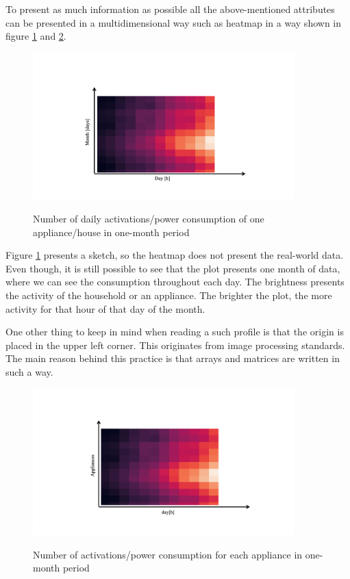 To present as much information as possible all the above-mentioned attributes 
can be presented in a multidimensional way such as heatmap in a way shown in figure \ref{fig:heatmap_2dtime} and \ref{fig:heatmap_all_appl}.

\begin{figure}[H]
	\centering
	\caption{Number of daily activations/power consumption of one appliance/house in one-month period}
	\includegraphics[width=0.9\textwidth]{Figures/profile_sketches/Slide10.png}
	\label{fig:heatmap_2dtime}
\end{figure}

Figure \ref{fig:heatmap_2dtime} presents a sketch, so the heatmap does not present the real-world data. 
Even though, it is still possible to see that the plot presents one month of data, where we can see the consumption throughout each day.
The brightness presents the activity of the household or an appliance. 
The brighter the plot, the more activity for that hour of that day of the month.

One other thing to keep in mind when reading a such profile is that the origin is placed in the upper left corner.
This originates from image processing standards.
The main reason behind this practice is that arrays and matrices are written in such a way.

\begin{figure}[H]
	\centering
	\caption{Number of activations/power consumption for each appliance in one-month period}
	\includegraphics[width=0.9\textwidth]{Figures/profile_sketches/Slide12.png}
	\label{fig:heatmap_all_appl}
\end{figure}


